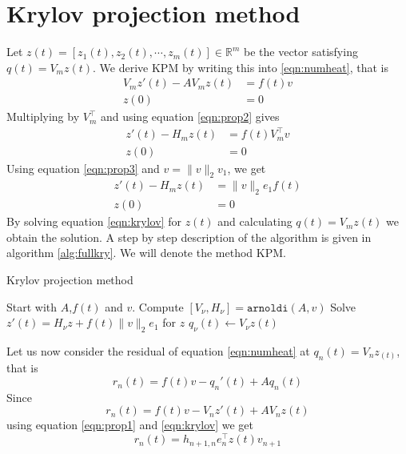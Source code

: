 \section{Krylov projection method} \label{sec:fullKPM}

Let $z(t) = [z_1(t), z_2(t), \cdots, z_m(t)] \in \mathbb{R}^m $ be the vector satisfying $q(t) = V_m z(t)$. 
We derive KPM by writing this into \eqref{eqn:numheat}, that is
\begin{equation}  \begin{aligned} \label{eqn:KPMtemp1}
V_m z'(t) - A V_m z(t) &= f(t) v \\
z(0)& = 0
\end{aligned} \end{equation}
Multiplying by $V_m^{\top}$ and using equation \eqref{eqn:prop2} gives
\begin{equation*} 
\begin{aligned} \label{eqn:KPMtemp2}
z'(t)-H_m z(t) &= f(t) V_m^{\top}  v  \\
z(0)& = 0
\end{aligned}
\end{equation*}
Using equation \eqref{eqn:prop3} and $v = \|v \|_2 v_1 $, we get
\begin{equation} 
\begin{aligned} \label{eqn:krylov}
z'(t) -H_m z(t) &=  \|v \|_2 e_1 f(t)\\
z(0)& = 0
\end{aligned}
\end{equation}
By solving equation \eqref{eqn:krylov} for $z(t)$ and calculating $ q(t) = V_m z(t) $ we obtain the solution. A step by step description of the algorithm is given in algorithm \ref{alg:fullkry}. 
 We will denote the method KPM.\\
\begin{algorithm}
\begin{algorithmic} \caption{Krylov projection method} \label{alg:fullkry} 
\STATE Start with $A$,$f(t)$ and $v$.
\STATE Compute $[V_\nu ,H_\nu] = \texttt{arnoldi}(A,v)$
\STATE Solve $  z'(t) = H_\nu z + f(t) \| v \|_2 e_1  $ for $z$
\STATE $ q_\nu (t) \leftarrow  V_\nu z(t) $
\end{algorithmic} 
\end{algorithm}

Let us now consider the residual of equation \eqref{eqn:numheat} at $q_n(t) = V_n z_(t)$, that is
\begin{equation*}
r_n(t) = f(t) v - q_n'(t) +Aq_n(t)
\end{equation*}
Since
\begin{equation*}
r_n(t) = f(t)v -V_n z'(t) + A V_n z(t)
\end{equation*}
using equation \eqref{eqn:prop1} and \eqref{eqn:krylov} we get
\begin{equation} \label{eqn:rn}
r_n(t) = h_{n+1,n}e_n^\top z(t) v_{n+1}
\end{equation}

